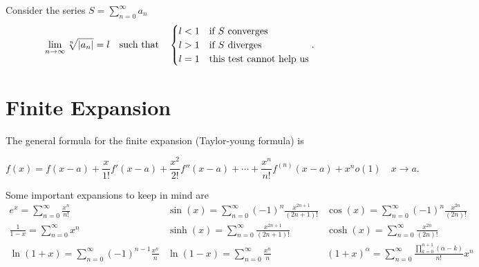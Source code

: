 \begin{theorem}
    Consider the series $S=\sum_{n=0}^{\infty} a_n$
    \[
        \lim_{n \to \infty}\sqrt[n]{|a_n|} = l\qq{such that} \begin{cases}l<1& \text{if $S$ converges}\\
        l>1& \text{if $S$ diverges}\\
l=1& \text{this test cannot help us}\\
\end{cases} 
.\]
        \end{theorem}
\section{Finite Expansion}
The general formula for the finite expansion (Taylor-young formula) is 

\[
    f(x) = f(x-a)+ \frac{x}{1!}f'(x-a)+\frac{x^2}{2!}f''(x-a)+\cdots+\frac{x^n}{n!}f^{(n)}(x-a)+x^no(1) \quad x\to a
.\]
 
Some important expansions to keep in mind are
\[\renewcommand{\arraystretch}{1.75}
\begin{array}{l|l|l}
    e^x=\sum_{n=0}^{\infty} \frac{x^n}{n!}\quad & \sin(x)=\sum_{n=0}^{\infty} (-1)^n \frac{x^{2n+1}}{(2n+1)!}&\cos(x)=\sum_{n=0}^{\infty} (-1)^n \frac{x^{2n}}{(2n)!}\\
            \frac{1}{1-x}=\sum_{n=0}^{\infty} x^n&\sinh(x)=\sum_{n=0}^{\infty} \frac{x^{2n+1}}{(2n+1)!}&\cosh(x)=\sum_{n=0}^{\infty} \frac{x^{2n}}{(2n)!}\\
            \ln(1+x)=\sum_{n=0}^{\infty} (-1)^{n-1}\frac{x^n}{n}&\ln(1-x)=\sum_{n=0}^{\infty} \frac{x^n}{n}&(1+x)^\alpha=\sum_{n=0}^{\infty} \frac{\prod_{k=0}^{n+1}(\alpha-k)  }{n!}x^n
\end{array}
\]
